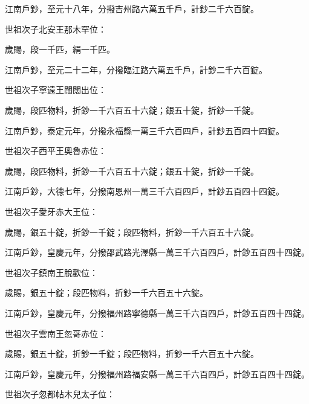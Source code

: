\begin{pinyinscope}
 江南戶鈔，至元十八年，分撥吉州路六萬五千戶，計鈔二千六百錠。



 世祖次子北安王那木罕位：



 歲賜，段一千匹，絹一千匹。



 江南戶鈔，至元二十二年，分撥臨江路六萬五千戶，計鈔二千六百錠。



 世祖次子寧遠王闊闊出位：



 歲賜，段匹物料，折鈔一千六百五十六錠；銀五十錠，折鈔一千錠。



 江南戶鈔，泰定元年，分撥永福縣一萬三千六百四戶，計鈔五百四十四錠。



 世祖次子西平王奧魯赤位：



 歲賜，段匹物料，折鈔一千六百五十六錠；銀五十錠，折鈔一千錠。



 江南戶鈔，大德七年，分撥南恩州一萬三千六百四戶，計鈔五百四十四錠。



 世祖次子愛牙赤大王位：



 歲賜，銀五十錠，折鈔一千錠；段匹物料，折鈔一千六百五十六錠。



 江南戶鈔，皇慶元年，分撥邵武路光澤縣一萬三千六百四戶，計鈔五百四十四錠。



 世祖次子鎮南王脫歡位：



 歲賜，銀五十錠；段匹物料，折鈔一千六百五十六錠。



 江南戶鈔，皇慶元年，分撥福州路寧德縣一萬三千六百四戶，計鈔五百四十四錠。



 世祖次子雲南王忽哥赤位：



 歲賜，銀五十錠，折鈔一千錠；段匹物料，折鈔一千六百五十六錠。



 江南戶鈔，皇慶元年，分撥福州路福安縣一萬三千六百四戶，計鈔五百四十四錠。



 世祖次子忽都帖木兒太子位：




\end{pinyinscope}
